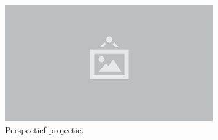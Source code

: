 \begin{figure}
  \centering
  \includegraphics[width=0.8\textwidth]{./img/raw/placeholder.png}
  \caption{Perspectief projectie.}
  \label{fig:vp-perspectief}
\end{figure}
